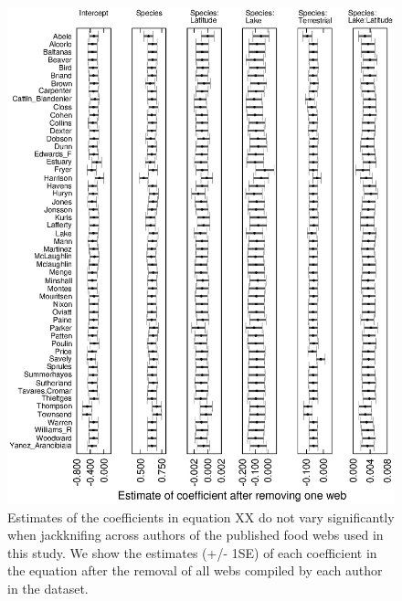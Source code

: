 \documentclass[12pt]{article}
\begin{document}
    \begin{figure}[h]
    \centerline{\includegraphics*[width=.8\textwidth]{Figures/Jackknife/LS_author.eps}}
    \caption{Estimates of the coefficients in equation XX do not vary significantly
    when jackknifing across authors of the published food webs used in this study. 
    We show the estimates (+/- 1SE) of each coefficient
    in the equation after the removal of all webs compiled by each author in the dataset.}
    \label{LS_web}
    \end{figure}
\end{document}
